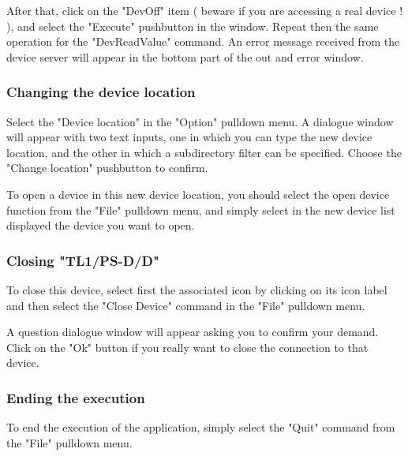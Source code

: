 After that, click on the "DevOff" item ( beware if you are accessing a  
real device ! ), and select the "Execute"  
pushbutton in the window. Repeat then the same operation for the 
"DevReadValue" command.
An error message received from the device server will appear in the bottom part of the out and error window.

\subsubsection{Changing the device location}

Select the "Device location" in the "Option" pulldown menu. A dialogue
window will appear with two text inputs, one in which you can type the new device location, and the other in which a subdirectory filter can be specified.
Choose the "Change location" pushbutton to confirm.

To open a device in this new device location, you should select the open
device function from the "File" pulldown menu, and simply select in the new
device list displayed the device you want to open.

\subsubsection{Closing "TL1/PS-D/D"}

To close this device, select first the associated icon by clicking on its icon label and then select the "Close Device" command in the "File" pulldown menu. 

A question dialogue window will appear asking you to confirm your demand.
Click on the "Ok" button if you really want to close the connection to
that device.

\subsubsection{Ending the execution}

To end the execution of the application, simply select the "Quit" command
from the "File" pulldown menu.

